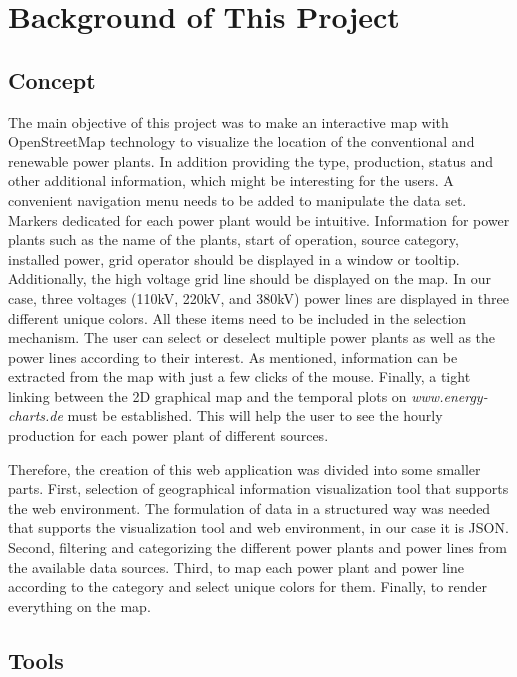 \chapter{Background of This Project}
\label{chap:background}

\section{Concept}

The main objective of this project was to make an interactive map with OpenStreetMap technology to visualize the location of the conventional and renewable power plants. In addition providing the type, production, status and other additional information, which might be interesting for the users. A convenient navigation menu needs to be added to manipulate the data set. Markers dedicated for each power plant would be intuitive. Information for power plants such as the name of the plants, start of operation, source category, installed power, grid operator should be displayed in a window or tooltip. Additionally, the high voltage grid line should be displayed on the map. In our case, three voltages (110kV, 220kV, and 380kV) power lines are displayed in three different unique colors. All these items need to be included in the selection mechanism. The user can select or deselect multiple power plants as well as the power lines according to their interest. As mentioned, information can be extracted from the map with just a few clicks of the mouse. Finally, a tight linking between the 2D graphical map and the temporal plots on \textit{www.energy-charts.de} must be established. This will help the user to see the hourly production for each power plant of different sources.

Therefore, the creation of this web application was divided into some smaller parts. First, selection of geographical information visualization tool that supports the web environment. The formulation of data in a structured way was needed that supports the visualization tool and web environment, in our case it is JSON. Second, filtering and categorizing the different power plants and power lines from the available data sources. Third, to map each power plant and power line according to the category and select unique colors for them. Finally, to render everything on the map.   
\clearpage  

\section{Tools}

